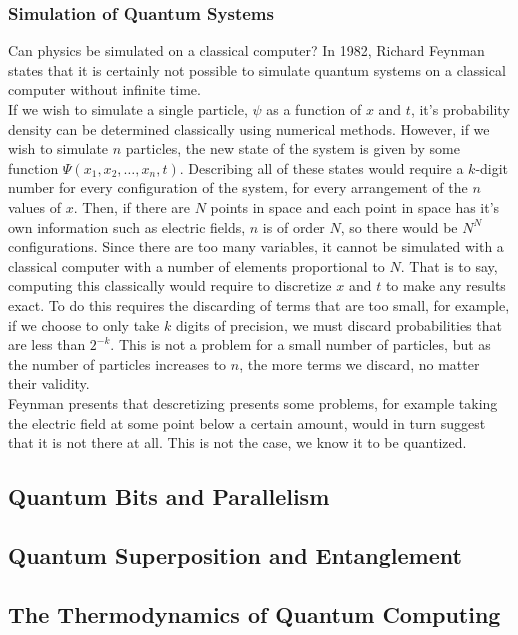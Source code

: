 \documentclass{amsart}
\numberwithin{equation}{section}
\begin{document}
\subsubsection{Simulation of Quantum Systems}
\begin{justify}
Can physics be simulated on a classical computer? In 1982, Richard Feynman states that it is certainly not possible to simulate quantum systems on a classical computer without infinite time. \cite{Feynman1982} \\

If we wish to simulate a single particle, $\psi$ as a function of $x$ and $t$, it's probability density can be determined classically using numerical methods. \cite{Schroedinger1926} However, if we wish to simulate $n$ particles, the new state of the system is given by some function $\Psi(x_{1}, x_{2}, \ldots, x_{n}, t)$. Describing all of these states would require a $k$-digit number for every configuration of the system, for every arrangement of the $n$ values of $x$. Then, if there are $N$ points in space and each point in space has it's own information such as electric fields, $n$ is of order $N$, so there would be $N^N$ configurations. Since there are too many variables, it cannot be simulated with a classical computer with a number of elements proportional to $N$. That is to say, computing this classically would require to discretize $x$ and $t$ to make any results exact. To do this requires the discarding of terms that are too small, for example, if we choose to only take $k$ digits of precision, we must discard probabilities that are less than $2^{-k}$. This is not a problem for a small number of particles, but as the number of particles increases to $n$, the more terms we discard, no matter their validity. \\

Feynman presents that descretizing presents some problems, for example taking the electric field at some point below a certain amount, would in turn suggest that it is not there at all. This is not the case, we know it to be quantized. 
\end{justify}
\subsection{Quantum Bits and Parallelism}
\subsection{Quantum Superposition and Entanglement}
\subsection{The Thermodynamics of Quantum Computing}
\end{document}

